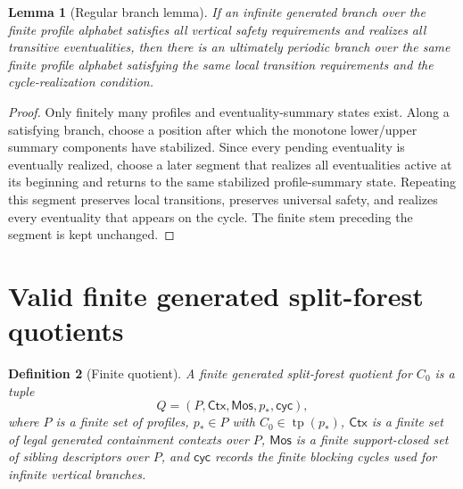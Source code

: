 \documentclass[11pt]{article}
\newtheorem{definition}{Definition}[section]
\newtheorem{lemma}[definition]{Lemma}
\theoremstyle{remark}
\newcommand{\tp}{\operatorname{tp}}
\newcommand{\Ctx}{\mathsf{Ctx}}
\newcommand{\Mos}{\mathsf{Mos}}
\begin{document}
\begin{lemma}[Regular branch lemma]\label{lem:regular-branch}
If an infinite generated branch over the finite profile alphabet satisfies all vertical safety requirements and realizes all transitive eventualities, then there is an ultimately periodic branch over the same finite profile alphabet satisfying the same local transition requirements and the cycle-realization condition.
\end{lemma}
\begin{proof}
Only finitely many profiles and eventuality-summary states exist.  Along a satisfying branch, choose a position after which the monotone lower/upper summary components have stabilized.  Since every pending eventuality is eventually realized, choose a later segment that realizes all eventualities active at its beginning and returns to the same stabilized profile-summary state.  Repeating this segment preserves local transitions, preserves universal safety, and realizes every eventuality that appears on the cycle.  The finite stem preceding the segment is kept unchanged.
\end{proof}

\section{Valid finite generated split-forest quotients}
\begin{definition}[Finite quotient]\label{def:quotient}
A finite generated split-forest quotient for $C_0$ is a tuple
\[
Q=(P,\Ctx,\Mos,p_*,\mathsf{cyc}),
\]
where $P$ is a finite set of profiles, $p_*\in P$ with $C_0\in\tp(p_*)$, $\Ctx$ is a finite set of legal generated containment contexts over $P$, $\Mos$ is a finite support-closed set of sibling descriptors over $P$, and $\mathsf{cyc}$ records the finite blocking cycles used for infinite vertical branches.
\end{definition}
\end{document}
